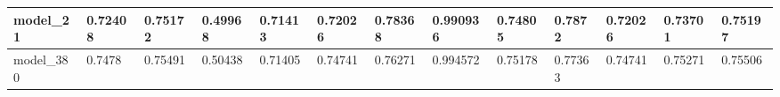 \begin{tabular}{|l|l|l|l|l|l|l|l|l|l|l|l|l|}
model\_21      & 0.72408     & 0.75172        & 0.49968      & 0.71413          & 0.72026              & 0.78368              & 0.990936     & 0.74805           & 0.7872             & 0.72026         & 0.73701     & 0.75197      \\ \hline
model\_380     & 0.7478      & 0.75491        & 0.50438      & 0.71405          & 0.74741              & 0.76271              & 0.994572     & 0.75178           & 0.77363            & 0.74741         & 0.75271     & 0.75506      \\ \hline
\end{tabular}